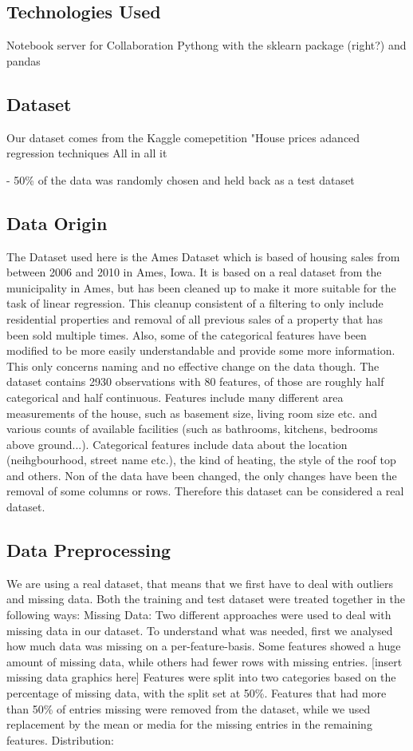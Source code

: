\subsection{Technologies Used}
Notebook server for Collaboration
Pythong with the sklearn package (right?) and pandas
\subsection{Dataset} 
Our dataset comes from the Kaggle comepetition "House prices adanced regression techniques \cite{kaggle}
All in all it 

- 50\% of the data was randomly chosen and held back as a test dataset
\subsection{Data Origin}
The Dataset used here is the Ames Dataset \cite{cock_2011} which is based of housing sales from between 2006 and 2010 in Ames, Iowa.
It is based on a real dataset from the municipality in Ames, but has been cleaned up to make it more suitable for the task of linear regression.
This cleanup consistent of a filtering to only include residential properties and removal of all previous sales of a property that has been sold multiple times.
Also, some of the categorical features have been modified to be more easily understandable and provide some more information. This only concerns naming and no effective change on the data though.
The dataset contains 2930 observations with 80 features, of those are roughly half categorical and half continuous. Features include many different area measurements of the house, such as basement size, living room size etc. and various counts of available facilities (such as bathrooms, kitchens, bedrooms above ground...). Categorical features include data about the location (neihgbourhood, street name etc.), the kind of heating, the style of the roof top and others.
Non of the data have been changed, the only changes have been the removal of some columns or rows. Therefore this dataset can be considered a real dataset.
\subsection{Data Preprocessing}
We are using a real dataset, that means that we first have to deal with outliers and missing data. Both the training and test dataset were treated together in the following ways:
Missing Data:\newline
Two different approaches were used to deal with missing data in our dataset. To understand what was needed, first we analysed how much data was missing on a per-feature-basis. Some features showed a huge amount of missing data, while others had fewer rows with missing entries.
[insert missing data graphics here]
Features were split into two categories based on the percentage of missing data, with the split set at 50\%. Features that had more than 50\% of entries missing were removed from the dataset, while we used replacement by the mean or media for the missing entries in the remaining features.\newline
Distribution:\newline
